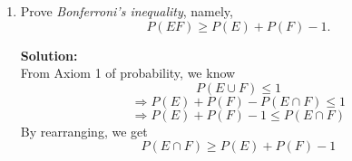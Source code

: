 \documentclass{report}
\begin{document}
\begin{enumerate}
\begin{enumerate}
\end{enumerate}

{\bf Solution:}

\begin{enumerate}
    \item $S=\{(i,j):i,j=1,2,3,4,5,6\}$, where the outcome $(i,j)$ is said to occur if $i$ appears on the leftmost die and $j$ on the other die.
    \item $6^2=36$
    \item $\frac{1}{6^2}=\frac{1}{36}$
    \item $\frac{{6 \choose 2}}{6^2}=\frac{15}{36}=\frac{5}{12}$
\end{enumerate}
	
	
\item Prove \emph{Bonferroni's inequality}, namely, 
\[
  P(EF)\geq P(E)+P(F)-1.
\]

{\bf Solution:}\\
From Axiom 1 of probability, we know
$$P(E\cup F)\leq 1$$
$$\Longrightarrow P(E)+P(F)-P(E\cap F)\leq 1$$
$$\Longrightarrow P(E)+P(F)-1\leq P(E\cap F)$$
By rearranging, we get
$$P(E\cap F)\geq P(E)+P(F)-1$$
	
\end{enumerate}
\end{document}
